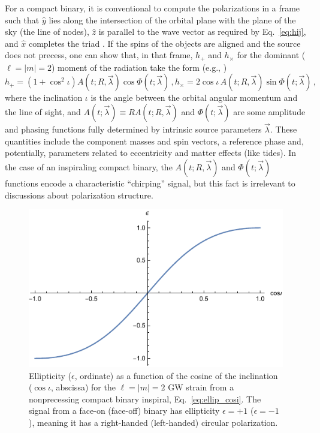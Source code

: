 \documentclass[aps,prd,twocolumn,superscriptaddress,preprintnumbers,floatfix,nofootinbib]{revtex4-2}
\newcommand{\beq}{\begin{equation}}
\newcommand{\eeq}{\end{equation}}
\newcommand*{\eq}[1]{Eq.~\eqref{eq:#1}}
\begin{document}
For a compact binary, it is conventional to compute the polarizations in a frame such that $\hat{y}$ lies along the intersection of the orbital plane with the plane of the sky (the line of nodes), $\hat{z}$ is parallel to the wave vector as required by \eq{hij}, and $\hat{x}$ completes the triad \cite{LALSuite:source}.
If the spins of the objects are aligned and the source does not precess, one can show that, in that frame, $h_+$ and $h_\times$ for the dominant ($\ell=|m|=2$) moment of the radiation take the form (e.g., \cite{Poisson2014})
\begin{subequations} \label{eq:cbc}
\beq
h_+ = \left(1 + \cos^2 \iota\right) A(t; R, \vec{\lambda}) \cos \Phi(t; \vec{\lambda}) \, , 
\label{eq:cbc_p} 
\eeq
\beq
h_\times = 2 \cos \iota\, A(t; R, \vec{\lambda}) \sin \Phi(t; \vec{\lambda})\, ,
\label{eq:cbc_c}
\eeq
\end{subequations}
where the inclination $\iota$ is the angle between the orbital angular momentum and the line of sight, and $A(t; \vec{\lambda}) \equiv R  A(t; R, \vec{\lambda})$ and $\Phi(t; \vec{\lambda})$ are some amplitude and phasing functions fully determined by intrinsic source parameters $\vec{\lambda}$.
These quantities include the component masses and spin vectors, a reference phase and, potentially, parameters related to eccentricity and matter effects (like tides).
In the case of an inspiraling compact binary, the $A(t; R, \vec{\lambda})$ and $\Phi(t; \vec{\lambda})$ functions encode a characteristic ``chirping'' signal, but this fact is irrelevant to discussions about polarization structure.

\begin{figure}
\includegraphics[width=\columnwidth]{ellip_cosi}
\caption{Ellipticity ($\epsilon$, ordinate) as a function of the cosine of the inclination ($\cos\iota$, abscissa) for the $\ell = |m| = 2$ GW strain from a nonprecessing compact binary inspiral, Eq.~\eqref{eq:ellip_cosi}. The signal from a face-on (face-off) binary has ellipticity $\epsilon = +1$ ($\epsilon=-1$), meaning it has a right-handed (left-handed) circular polarization.}
\label{fig:ellip_cosi}
\end{figure}
\end{document}
